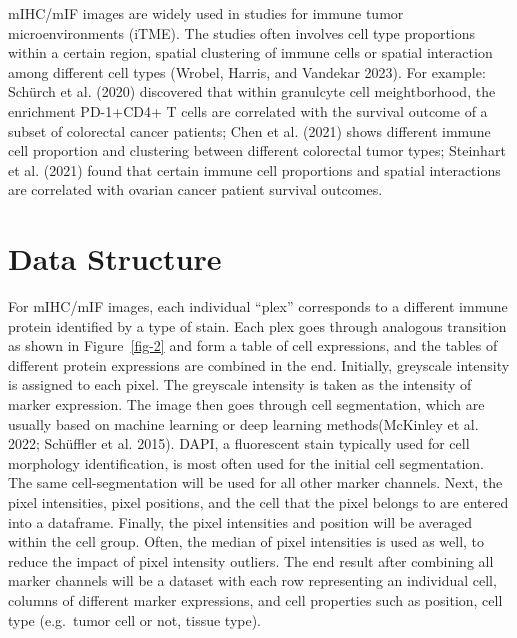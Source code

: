 \documentclass[
  letterpaper,
  DIV=11,
  numbers=noendperiod,
  oneside]{scrreprt}
\begin{document}
mIHC/mIF images are widely used in studies for immune tumor
microenvironments (iTME). The studies often involves cell type
proportions within a certain region, spatial clustering of immune cells
or spatial interaction among different cell types (Wrobel, Harris, and
Vandekar 2023). For example: Schürch et al. (2020) discovered that
within granulcyte cell meightborhood, the enrichment PD-1+CD4+ T cells
are correlated with the survival outcome of a subset of colorectal
cancer patients; Chen et al. (2021) shows different immune cell
proportion and clustering between different colorectal tumor types;
Steinhart et al. (2021) found that certain immune cell proportions and
spatial interactions are correlated with ovarian cancer patient survival
outcomes.

\hypertarget{data-structure}{%
\section{Data Structure}\label{data-structure}}

For mIHC/mIF images, each individual ``plex'' corresponds to a different
immune protein identified by a type of stain. Each plex goes through
analogous transition as shown in Figure~\ref{fig-2} and form a table of
cell expressions, and the tables of different protein expressions are
combined in the end. Initially, greyscale intensity is assigned to each
pixel. The greyscale intensity is taken as the intensity of marker
expression. The image then goes through cell segmentation, which are
usually based on machine learning or deep learning methods(McKinley et
al. 2022; Schüffler et al. 2015). DAPI, a fluorescent stain typically
used for cell morphology identification, is most often used for the
initial cell segmentation. The same cell-segmentation will be used for
all other marker channels. Next, the pixel intensities, pixel positions,
and the cell that the pixel belongs to are entered into a dataframe.
Finally, the pixel intensities and position will be averaged within the
cell group. Often, the median of pixel intensities is used as well, to
reduce the impact of pixel intensity outliers. The end result after
combining all marker channels will be a dataset with each row
representing an individual cell, columns of different marker
expressions, and cell properties such as position, cell type (e.g.~tumor
cell or not, tissue type).
\end{document}
